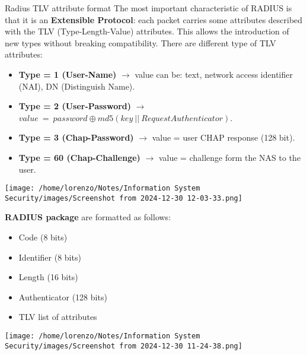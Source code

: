 \begin{center}
\begin{quotebox-yellow}{Radius TLV attribute format}
    The most important characteristic of RADIUS is that it is an \textbf{Extensible Protocol}: each packet carries some attributes described with the TLV (Type-Length-Value) attributes.
    This allows the introduction of new types without breaking compatibility. There are different type of TLV attributes:
    \vspace{0.1cm}
    \begin{itemize}
        \item \textbf{Type = 1 (User-Name)} \(\rightarrow \) value can be: text, network access identifier (NAI), DN (Distinguish Name).
        \item \textbf{Type = 2 (User-Password)} \(\rightarrow \) \(value\ =\ password \oplus md5(key\ ||\ Request Authenticator)\).
        \item \textbf{Type = 3 (Chap-Password)} \(\rightarrow \) value = user CHAP response (128 bit).
        \item \textbf{Type = 60 (Chap-Challenge)} \(\rightarrow \) value = challenge form the NAS to the user.
    \end{itemize}
        \vspace{0.1cm}
        \centering
        \texttt{[image: /home/lorenzo/Notes/Information System Security/images/Screenshot from 2024-12-30 12-03-33.png]}
\end{quotebox-yellow}
\end{center}
\vspace{0.0cm}
\noindent
\begin{minipage}{0.5\textwidth}
    \textbf{RADIUS package} are formatted as follows:
    \begin{itemize}
        \item Code (8 bits)
        \item Identifier (8 bits)
        \item Length (16 bits)
        \item Authenticator (128 bits)
        \item TLV list of attributes
    \end{itemize} 
\end{minipage} 
\hspace{0.2cm}
\begin{minipage}{0.4\textwidth}
    \texttt{[image: /home/lorenzo/Notes/Information System Security/images/Screenshot from 2024-12-30 11-24-38.png]}
\end{minipage}
